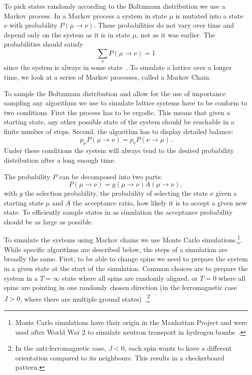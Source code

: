 \documentclass[11pt, a4paper]{report} %
\begin{document}
To pick states randomly according to the Boltzmann distribution we use a Markov process.
In a Markov process a system in state \(\mu\) is mutated into a state \(\nu\) with probability \(P(\mu\to\nu)\).
These probabilities do not vary over time and depend only on the system as it is in state \(\mu\), not as it was earlier.
The probabilities should satisfy
\begin{equation}
	\sum_{\nu} P(\mu \to \nu) = 1
\end{equation}
since the system is always in some state~\cite{newman:1999,landau:2015}.
To simulate a lattice over a longer time, we look at a series of Markov processes, called a Markov Chain.

To sample the Boltzmann distribution and allow for the use of importance sampling any algorithms we use to simulate lattice systems have to be conform to two conditions.
First the process has to be ergodic.
This means that given a starting state, any other possible state of the system should be reachable in a finite number of steps.
Second, the algorithm has to display detailed balance:
\begin{equation}\label{eq:detailed_balance}
	p_{\mu} P(\mu \to \nu) = p_{\nu} P(\nu \to \mu).
\end{equation}
Under these conditions the system will always tend to the desired probability distribution after a long enough time.

The probability \(P\) can be decomposed into two parts:
\begin{equation}
	P(\mu\to\nu) = g(\mu\to\nu) A(\mu\to \nu),
\end{equation}
with \(g\) the selection probability, the probability of selecting the state \(\nu\) given a starting state \(\mu\) and \(A\) the acceptance ratio, how likely it is to accept a given new state.
To efficiently sample states in as simulation the acceptance probability should be as large as possible.

To simulate the systems using Markov chains we use Monte Carlo simulations.\footnote{Monte Carlo simulations have their origin in the Manhattan Project and were used after World War 2 to simulate neutron transport in hydrogen bombs~\cite{newman:1999}.}.
While specific algorithms are described below, the steps of a simulation are broadly the same.
First, to be able to change spins we need to prepare the system in a given state at the start of the simulation.
Common choices are to prepare the system in a \(T=\infty\) state where all spins are randomly aligned, or \(T=0\) where all spins are pointing in one randomly chosen direction (in the ferromagnetic case \(J>0\), where there are multiple ground states)~\cite{newman:1999}.\footnote{In the anti-ferromagnetic case, \(J < 0\), each spin wants to have a different orientation compared to its neighbours. This results in a checkerboard pattern.}
\end{document}
